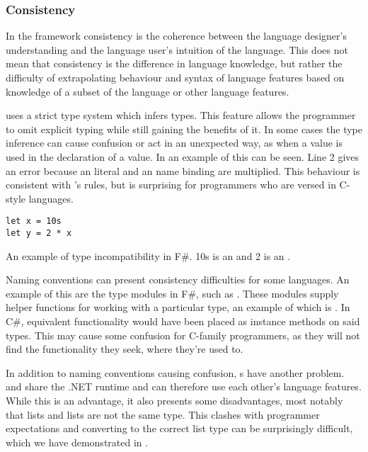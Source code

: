 \subsubsection{Consistency}
In the \cognitive framework consistency is the coherence between the language designer's understanding and the language user's intuition of the language\cite{green1996usability}. This does not mean that consistency is the difference in language knowledge, but rather the difficulty of extrapolating behaviour and syntax of language features based on knowledge of a subset of the language or other language features.

\fs uses a strict type system which infers types. This feature allows the programmer to omit explicit typing while still gaining the benefits of it. In some cases the type inference can cause confusion or act in an unexpected way, as when a  value is used in the declaration of a  value. In  an example of this can be seen. Line 2 gives an error because an  literal and an  name binding are multiplied. This behaviour is consistent with \fs's rules, but is surprising for programmers who are versed in C-style languages.

\begin{listing}[H]
\begin{verbatim}
let x = 10s
let y = 2 * x
\end{verbatim}
\caption{An example of type incompatibility in F\#. 10s is an  and 2 is an .}
\label{lst:type-incompat}
\end{listing}

Naming conventions can present consistency difficulties for some languages. An example of this are the type modules in F\#, such as . These modules supply helper functions for working with a particular type, an example of which is . In C\#, equivalent functionality would have been placed as instance methods on said types. This may cause some confusion for C-family programmers, as they will not find the functionality they seek, where they're used to.

In addition to naming conventions causing confusion, s have another problem. \fs and \cs share the .NET runtime and can therefore use each other's language features. While this is an advantage, it also presents some disadvantages, most notably that \fs lists and \cs lists are not the same type. This clashes with programmer expectations and converting to the correct list type can be surprisingly difficult, which we have demonstrated in .

